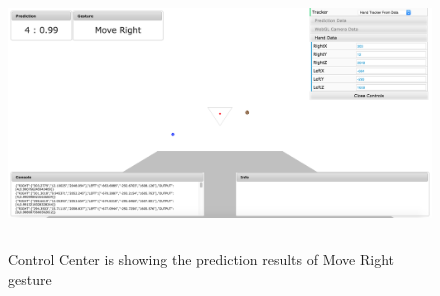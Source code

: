 \begin{figure}
	[h] \centering 
	\includegraphics[height=70mm]{figures/result/cc-move-right.png} \caption{Control Center is showing the prediction results of Move Right gesture}
	\label{res:cc:move:right} 
\end{figure}
